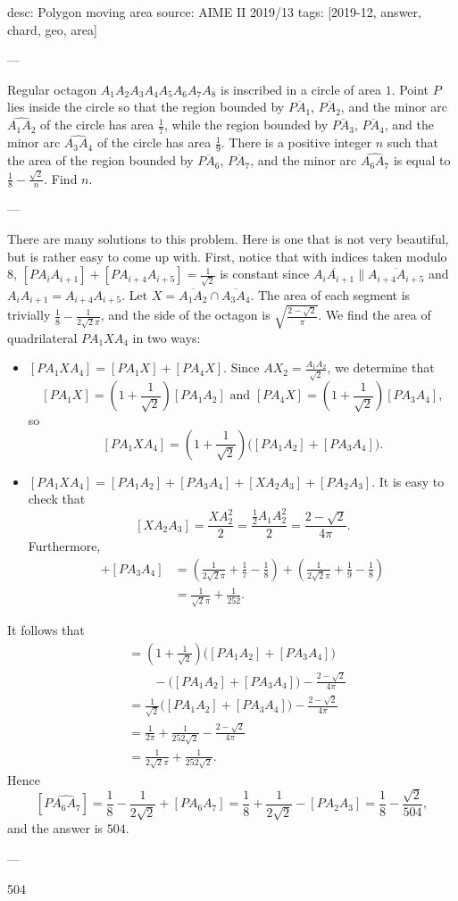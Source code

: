 desc: Polygon moving area
source: AIME II 2019/13
tags: [2019-12, answer, chard, geo, area]

---

Regular octagon $A_1A_2A_3A_4A_5A_6A_7A_8$ is inscribed in a circle of area $1$. Point $P$ lies inside the circle so that the region bounded by $\overline{PA_1}$, $\overline{PA_2}$, and the minor arc $\widehat{A_1A_2}$ of the circle has area $\tfrac17$, while the region bounded by $\overline{PA_3}$, $\overline{PA_4}$, and the minor arc $\widehat{A_3A_4}$ of the circle has area $\tfrac 19$. There is a positive integer $n$ such that the area of the region bounded by $\overline{PA_6}$, $\overline{PA_7}$, and the minor arc $\widehat{A_6A_7}$ is equal to $\tfrac18 - \tfrac{\sqrt 2}n$. Find $n$.

---

There are many solutions to this problem. Here is one that is not very beautiful, but is rather easy to come up with. First, notice that with indices taken modulo $8$, $[PA_iA_{i+1}]+[PA_{i+4}A_{i+5}]=\tfrac1{\sqrt2}$ is constant since $\overline{A_iA_{i+1}}\parallel\overline{A_{i+4}A_{i+5}}$ and $A_iA_{i+1}=A_{i+4}A_{i+5}$. Let $X=\overline{A_1A_2}\cap\overline{A_3A_4}$. The area of each segment is trivially $\tfrac18-\tfrac1{2\sqrt2\pi}$, and the side of the octagon is $\sqrt{\tfrac{2-\sqrt2}{\pi}}$. We find the area of quadrilateral $PA_1XA_4$ in two ways:
\begin{itemize}
    \item $[PA_1XA_4]=[PA_1X]+[PA_4X]$. Since $AX_2=\tfrac{A_1A_2}{\sqrt2}$, we determine that \[[PA_1X]=\left(1+\frac1{\sqrt2}\right)[PA_1A_2]\text{ and }[PA_4X]=\left(1+\frac1{\sqrt2}\right)[PA_3A_4],\]
        so \[[PA_1XA_4]=\left(1+\frac1{\sqrt2}\right)\big([PA_1A_2]+[PA_3A_4]\big).\]
    \item $[PA_1XA_4]=[PA_1A_2]+[PA_3A_4]+[XA_2A_3]+[PA_2A_3]$. It is easy to check that \[[XA_2A_3]=\frac{XA_2^2}2=\frac{\tfrac12 A_1A_2^2}2=\frac{2-\sqrt2}{4\pi}.\]
        Furthermore,
        \begin{align*}
            [PA_1A_2]+[PA_3A_4]&=\left(\frac1{2\sqrt2\pi}+\frac17-\frac18\right)+\left(\frac1{2\sqrt2\pi}+\frac19-\frac18\right)\\
            &=\frac1{\sqrt2\pi}+\frac1{252}.
        \end{align*}
\end{itemize}
It follows that
\begin{align*}
    [PA_2A_3]&=\left(1+\frac1{\sqrt2}\right)\big([PA_1A_2]+[PA_3A_4]\big)\\
    &\qquad-\big([PA_1A_2]+[PA_3A_4]\big)-\frac{2-\sqrt2}{4\pi}\\
    &=\frac1{\sqrt2}\big([PA_1A_2]+[PA_3A_4]\big)-\frac{2-\sqrt2}{4\pi}\\
    &=\frac1{2\pi}+\frac1{252\sqrt2}-\frac{2-\sqrt2}{4\pi}\\
    &=\frac1{2\sqrt2\pi}+\frac1{252\sqrt2}.
\end{align*}
Hence \[\left[P\widehat{A_6A_7}\right]=\frac18-\frac1{2\sqrt2}+[PA_6A_7]=\frac18+\frac1{2\sqrt2}-[PA_2A_3]=\frac18-\frac{\sqrt2}{504},\]
and the answer is $504$.

---

504
